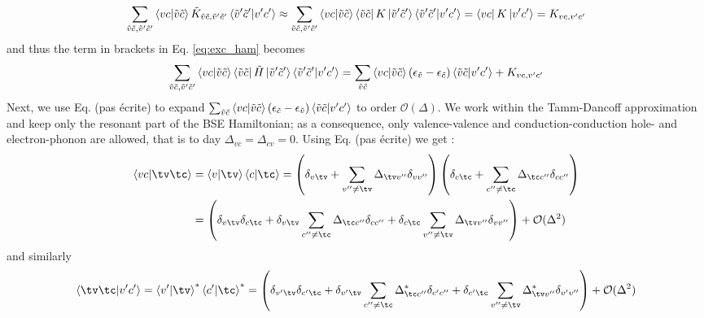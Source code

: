 \begin{equation}
    \sum_{\Tilde{v}\Tilde{c},\Tilde{v}'\Tilde{c}'} \bra{vc}\ket{\Tilde{v}\Tilde{c}} \Tilde{K}_{\Tilde{v}\Tilde{c},\Tilde{v}'\Tilde{c}'} \bra{\Tilde{v}'\Tilde{c}'}\ket{v'c'} 
    \approx  \sum_{\Tilde{v}\Tilde{c},\Tilde{v}'\Tilde{c}'} \bra{vc}\ket{\Tilde{v}\Tilde{c}} 
    \bra{\Tilde{v}\Tilde{c}} K \ket{\Tilde{v}'\Tilde{c}'}\bra{\Tilde{v}'\Tilde{c}'}\ket{v'c'} = \bra{vc} K \ket{v'c'} = K_{vc,v'c'}
\end{equation}
and thus the term in brackets in Eq. \eqref{eq:exc_ham} becomes 
\begin{equation}
    \sum_{\Tilde{v}\Tilde{c},\Tilde{v}'\Tilde{c}'} \bra{vc}\ket{\Tilde{v}\Tilde{c}}  \bra{\Tilde{v}\Tilde{c}} \Tilde{H} \ket{\Tilde{v}'\Tilde{c}'} \bra{\Tilde{v}'\Tilde{c}'}\ket{v'c'} = \sum_{\Tilde{v}\Tilde{c}} \bra{vc}\ket{\Tilde{v}\Tilde{c}} (\epsilon_{\Tilde{v}} - \epsilon_{\Tilde{c}}) \bra{\Tilde{v}\Tilde{c}}\ket{v'c'} +  K_{vc,v'c'} 
\end{equation}
Next, we use Eq. (pas écrite) to expand $\sum_{\Tilde{v}\tilde{c}} \bra{vc}\ket{\Tilde{v}\Tilde{c}} (\epsilon_{\Tilde{c}} - \epsilon_{\Tilde{v}})\bra{\Tilde{v}\Tilde{c}}\ket{v'c'}$ to order $\mathcal{O}(\Delta)$. We work within the Tamm-Dancoff approximation and keep only the resonant part of the BSE Hamiltonian; as a consequence, only valence-valence and conduction-conduction hole- and electron-phonon are allowed, that is to day $\Delta_{vc} = \Delta_{cv} = 0$. Using Eq. (pas écrite) we get :
\begin{align}
\begin{split}
    \bra{vc}\ket{\tv\tc} &= \bra{v}\ket{\tv}\bra{c}\ket{\tc} = \left(\delta_{v\tv} + \sum_{v''\neq\tv}\Delta_{\tv v''}\delta_{vv''}\right) \left(\delta_{c\tc} + \sum_{c''\neq \tc}\Delta_{\tc c''}\delta_{cc''}\right) \\
    &= \left( \delta_{v\tv}\delta_{c\tc} + \delta_{v\tv} \sum_{c''\neq\tc} \Delta_{\tc c''}\delta_{cc''} + \delta_{c\tc}\sum_{v''\neq \tv} \Delta_{\tv v''} \delta_{vv''} \right) + \mathcal{O}(\Delta^2)
\end{split}
\end{align}
and similarly
\begin{equation}
    \bra{\tv\tc}\ket{v'c'} = \bra{v'}\ket{\tv}^*\bra{c'}\ket{\tc}^* = \left( \delta_{v'\tv}\delta_{c'\tc} + \delta_{v'\tv} \sum_{c''\neq\tc} \Delta^*_{\tc c''}\delta_{c'c''} + \delta_{c'\tc}\sum_{v''\neq \tv} \Delta^*_{\tv v''} \delta_{v'v''}  \right)  + \mathcal{O}(\Delta^2)
\end{equation}

